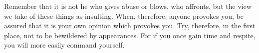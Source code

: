 Remember that it is not he who gives abuse or blows, who affronts, but
the view we take of these things as insulting. When, therefore, anyone
provokes you, be assured that it is your own opinion which provokes you.
Try, therefore, in the first place, not to be bewildered by appearances.
For if you once gain time and respite, you will more easily command
yourself.
